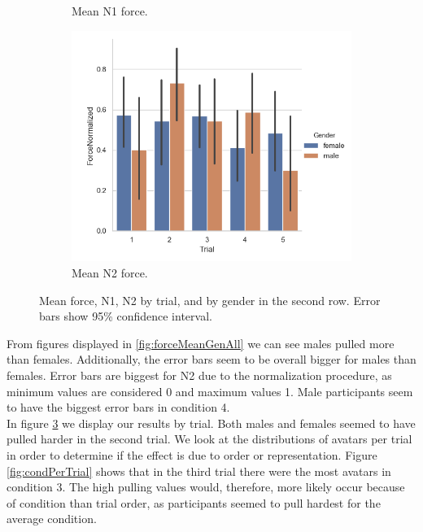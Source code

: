 \begin{figure}[H]
\begin{subfigure}[b]{0.3\textwidth}
         \caption{Mean N1 force.}
     \label{fig:forceN1TrialGen}
     \end{subfigure}
     \hspace{7mm}
      \begin{subfigure}[b]{0.3\textwidth}
         \centering
     \includegraphics[scale=0.4]{Files/Plots/forceNormalized_mean_by_trial_gen.png}
         \caption{Mean N2 force.}
     \label{fig:forceN2TrialGen}
     \end{subfigure}
     \caption{Mean force, N1, N2  by trial, and by gender in the second row. Error bars show 95\%  confidence interval.}
     \label{fig:allForceTrial}
\end{figure} 
From figures displayed in \ref{fig:forceMeanGenAll} we can see males pulled more than females. Additionally, the error bars seem to be overall bigger for males than females. Error bars are biggest for N2 due to the normalization procedure, as minimum values are considered 0 and maximum values 1. Male participants seem to have the biggest error bars in condition 4.
\\
In figure \ref{fig:allForceTrial} we display our results by trial. Both males and females seemed to have pulled harder in the second trial. We look at the distributions of avatars per trial in order to determine if the effect is due to order or representation. Figure \ref{fig:condPerTrial} shows that in the third trial there were the most avatars in condition 3. The high pulling values would, therefore, more likely occur because of condition than trial order, as participants seemed to pull hardest for the average condition.
